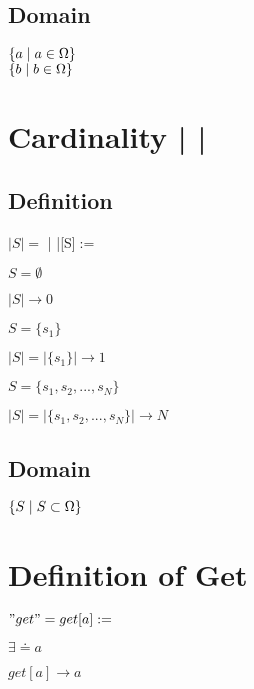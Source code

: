 \documentclass[11pt]{article}
\begin{document}
\subsection{Domain}
\begin{center}
$
\{ a \hspace{1mm}|\hspace{1mm} a \in \Omega\}
$
\\ \vspace{2mm}
$
\{ b \hspace{1mm}|\hspace{1mm} b \in \Omega\}
$
\end{center}








\newpage
\section{Cardinality | |}
\subsection{Definition}
\begin{center}
$
|S| = $ | |[S\hspace{.2mm}]$:=
$
\end{center}
$S = \emptyset$
\begin{center}
$
|S| \rightarrow 0
$
\end{center}
$S = \{s_1\}$
\begin{center}
$
|S| = |\{s_1\}| \rightarrow 1
$
\end{center}
$S = \{s_1,s_2,...,s_N\}$
\begin{center}
$
|S| = |\{s_1,s_2,...,s_N\}| \rightarrow N
$
\end{center}
\subsection{Domain}
\begin{center}
$
\{S \hspace{1mm} | \hspace{1mm} S \subset \Omega\}
$
\end{center}




\section{Definition of Get}
\begin{center}
$
"get" = get[a] :=
$
\end{center}
\vspace{1mm}
$\exists \doteq a$
\begin{center}
$
get[a] \rightarrow a
$
\end{center}
\end{document}
